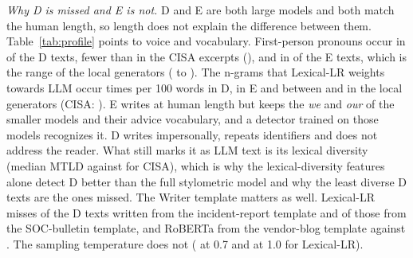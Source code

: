 \documentclass[journal]{IEEEtran}
\begin{document}
\emph{Why D is missed and E is not.} D and E are both large models and both match the human length, so length does
not explain the difference between them. Table~\ref{tab:profile} points to voice and vocabulary. First-person
pronouns occur in \ProfpctDFirst{} of the D texts, fewer than in the CISA excerpts (\ProfpctHumanFirst{}), and in
\ProfpctEFirst{} of the E texts, which is the range of the local generators (\ProfpctBFirst{} to
\ProfpctCFirst{}). The n-grams that Lexical-LR weights towards LLM occur \ProfDCuesLlm{} times per 100 words in D,
\ProfECuesLlm{} in E and between \ProfCCuesLlm{} and \ProfACuesLlm{} in the local generators (CISA:
\ProfHumanCuesLlm{}). E
writes at human length but keeps the \emph{we} and \emph{our} of the smaller models and their advice vocabulary,
and a detector trained on those models recognizes it. D writes impersonally, repeats identifiers and does not
address the reader. What still marks it as LLM text is its lexical diversity (median MTLD \MedMtldD{} against
\MedMtldHuman{} for CISA), which is why the lexical-diversity features alone detect D better than the full
stylometric model and why the least diverse D texts are the ones missed. The Writer template matters as well.
Lexical-LR misses \DmissIncidentLexlr{} of the D texts written from the incident-report template and
\DmissSocLexlr{} of those from the SOC-bulletin template, and RoBERTa \DmissBlogTrans{} from the vendor-blog
template against \DmissSocTrans{}. The sampling temperature does not (\DmisstempLowLexlr{} at 0.7 and
\DmisstempHighLexlr{} at 1.0 for Lexical-LR).
\end{document}
